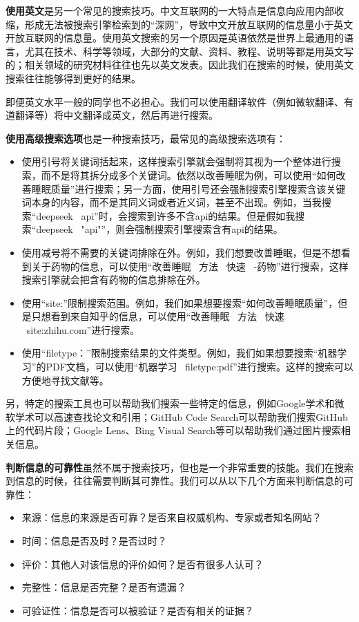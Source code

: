 \textbf{使用英文}是另一个常见的搜索技巧。中文互联网的一大特点是信息向应用内部收缩，形成无法被搜索引擎检索到的“深网”，导致中文开放互联网的信息量小于英文开放互联网的信息量。使用英文搜索的另一个原因是英语依然是世界上最通用的语言，尤其在技术、科学等领域，大部分的文献、资料、教程、说明等都是用英文写的；相关领域的研究材料往往也先以英文发表。因此我们在搜索的时候，使用英文搜索往往能够得到更好的结果。

即便英文水平一般的同学也不必担心。我们可以使用翻译软件（例如微软翻译、有道翻译等）将中文翻译成英文，然后再进行搜索。

\textbf{使用高级搜索选项}也是一种搜索技巧，最常见的高级搜索选项有：
\begin{itemize}
  \item 使用引号将关键词括起来，这样搜索引擎就会强制将其视为一个整体进行搜索，而不是将其拆分成多个关键词。依然以改善睡眠为例，可以使用“如何改善睡眠质量”进行搜索；另一方面，使用引号还会强制搜索引擎搜索含该关键词本身的内容，而不是其同义词或者近义词，甚至不出现。例如，当我搜索“deepseek \ api”时，会搜索到许多不含api的结果。但是假如我搜索“deepseek \ "api"”，则会强制搜索引擎搜索含有api的结果。
  \item 使用减号将不需要的关键词排除在外。例如，我们想要改善睡眠，但是不想看到关于药物的信息，可以使用“改善睡眠 \ 方法 \ 快速 \ -药物”进行搜索，这样搜索引擎就会把含有药物的信息排除在外。
  \item 使用“site:”限制搜索范围。例如，我们如果想要搜索“如何改善睡眠质量”，但是只想看到来自知乎的信息，可以使用“改善睡眠 \ 方法 \ 快速 \ site:zhihu.com”进行搜索。
  \item 使用“filetype：”限制搜索结果的文件类型。例如，我们如果想要搜索“机器学习”的PDF文档，可以使用“机器学习 \ filetype:pdf”进行搜索。这样的搜索可以方便地寻找文献等。
\end{itemize}

另，特定的搜索工具也可以帮助我们搜索一些特定的信息，例如Google学术和微软学术可以高速查找论文和引用；GitHub Code Search可以帮助我们搜索GitHub上的代码片段；Google Lens、Bing Visual Search等可以帮助我们通过图片搜索相关信息。

\textbf{判断信息的可靠性}虽然不属于搜索技巧，但也是一个非常重要的技能。我们在搜索到信息的时候，往往需要判断其可靠性。我们可以从以下几个方面来判断信息的可靠性：
\begin{itemize}
  \item 来源：信息的来源是否可靠？是否来自权威机构、专家或者知名网站？
  \item 时间：信息是否及时？是否过时？
  \item 评价：其他人对该信息的评价如何？是否有很多人认可？
  \item 完整性：信息是否完整？是否有遗漏？
  \item 可验证性：信息是否可以被验证？是否有相关的证据？
\end{itemize}

